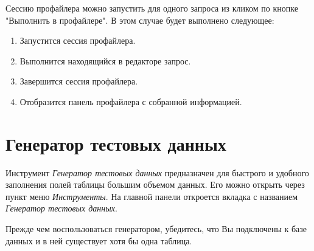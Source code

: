Сессию профайлера можно запустить для одного запроса из  кликом по кнопке "Выполнить в профайлере". В этом случае будет выполнено следующее:
\begin{enumerate}
	\item Запустится сессия профайлера.
	\item Выполнится находящийся в редакторе запрос.
	\item Завершится сессия профайлера.
	\item Отобразится панель профайлера с собранной информацией.
\end{enumerate}	

\newpage

\section{Генератор тестовых данных}\label{sec:test_data_generator}

Инструмент \textit{Генератор тестовых данных} предназначен для быстрого и удобного заполнения полей таблицы большим объемом данных. Его можно открыть через пункт меню \textit{Инструменты}.
На главной панели откроется вкладка с названием \textit{Генератор тестовых данных}. 

Прежде чем воспользоваться генератором, убедитесь, что Вы подключены к базе данных и в ней существует хотя бы одна таблица.  

